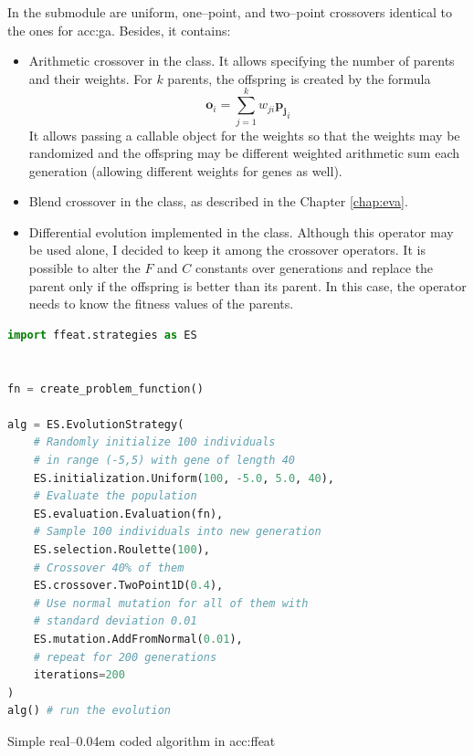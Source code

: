 In the  submodule are uniform, one--point, and two--point crossovers identical to the ones for \acrshort{acc:ga}. Besides, it contains:
\begin{itemize}
    \item Arithmetic crossover in the  class. It allows specifying the number of parents and their weights. For $k$ parents, the offspring is created by the formula 
    $$\mathbf{o}_i=\sum_{j=1}^k w_{ji}\mathbf{p_j}_i$$
    It allows passing a callable object for the weights so that the weights may be randomized and the offspring may be different weighted arithmetic sum each generation (allowing different weights for genes as well).
    \item Blend crossover in the  class, as described in the Chapter \ref{chap:eva}.
    \item Differential evolution implemented in the  class. Although this operator may be used alone, I decided to keep it among the crossover operators. It is possible to alter the $F$ and $C$ constants over generations and replace the parent only if the offspring is better than its parent. In this case, the operator needs to know the fitness values of the parents.
\end{itemize}

\begin{algorithm}[b!]
\begin{lstlisting}[language=Python, xrightmargin=18pt]
import ffeat.strategies as ES


fn = create_problem_function()

alg = ES.EvolutionStrategy(
    # Randomly initialize 100 individuals 
    # in range (-5,5) with gene of length 40
    ES.initialization.Uniform(100, -5.0, 5.0, 40),
    # Evaluate the population
    ES.evaluation.Evaluation(fn),
    # Sample 100 individuals into new generation
    ES.selection.Roulette(100),
    # Crossover 40% of them
    ES.crossover.TwoPoint1D(0.4),
    # Use normal mutation for all of them with 
    # standard deviation 0.01
    ES.mutation.AddFromNormal(0.01),
    # repeat for 200 generations
    iterations=200
)
alg() # run the evolution
\end{lstlisting}
\caption{Simple real--\kern0.04em coded algorithm in \acrshort*{acc:ffeat}}
\label{alg:esffeat}
\end{algorithm}

